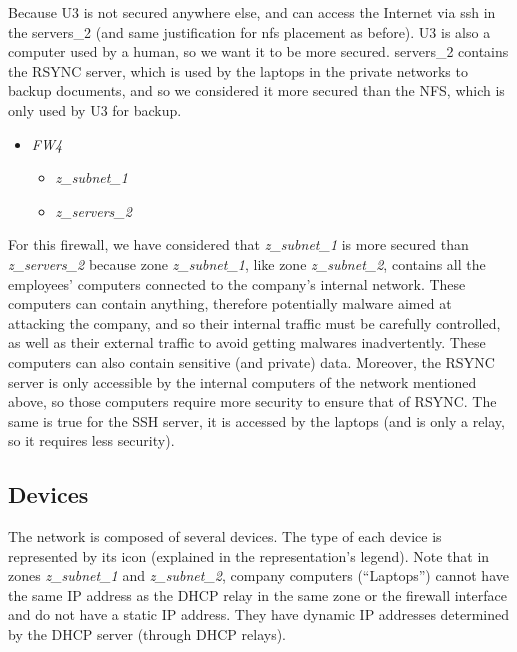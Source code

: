 \documentclass[a4paper, 12pt]{article}
\begin{document}
    Because U3 is not secured anywhere else, and can access the Internet via ssh in the servers\_2 (and same justification for nfs placement as before). U3 is also a computer used by a human, so we want it to be more secured. servers\_2 contains the RSYNC server, which is used by the laptops in the private networks to backup documents, and so we considered it more secured than the NFS, which is only used by U3 for backup.
    
    \begin{itemize}
	    \item \emph{FW4}
	    \begin{itemize}
	        \item \emph{z\_subnet\_1}
	        \item \emph{z\_servers\_2}
	    \end{itemize}
	\end{itemize}
	
	For this firewall, we have considered that \emph{z\_subnet\_1} is more secured than \emph{z\_servers\_2} because zone \emph{z\_subnet\_1}, like zone \emph{z\_subnet\_2}, contains all the employees' computers connected to the company's internal network. These computers can contain anything, therefore potentially malware aimed at attacking the company, and so their internal traffic must be carefully controlled, as well as their external traffic to avoid getting malwares inadvertently. These computers can also contain sensitive (and private) data. Moreover, the RSYNC server is only accessible by the internal computers of the network mentioned above, so those computers require more security to ensure that of RSYNC. The same is true for the SSH server, it is accessed by the laptops (and is only a relay, so it requires less security).
	
	\subsection{Devices}
	
	The network is composed of several devices. The type of each device is represented by its icon (explained in the representation's legend). Note that in zones \emph{z\_subnet\_1} and \emph{z\_subnet\_2}, company computers (\enquote{Laptops}) cannot have the same IP address as the DHCP relay in the same zone or the firewall interface and do not have a static IP address. They have dynamic IP addresses determined by the DHCP server (through DHCP relays).
\end{document}
